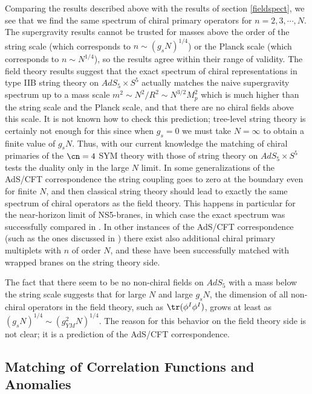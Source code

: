 Comparing the results described above with the results of section
\ref{fieldspect}, we see that we find the same spectrum of chiral
primary operators for $n=2,3,\cdots,N$. The supergravity results
cannot be trusted for masses above the order of the string scale
(which corresponds to $n\sim (g_s N)^{1/4}$) or the Planck scale
(which corresponds to $n\sim N^{1/4}$), so the results agree within
their range of validity. The field theory results suggest that the
exact spectrum of chiral representations in type IIB string theory on
$AdS_5\times S^5$ actually matches the naive supergravity spectrum up
to a mass scale $m^2 \sim N^2 / R^2 \sim N^{3/2} M_p^2$ which is much
higher than the string scale and the Planck scale, and that there are
no chiral fields above this scale. It is not known how to check this
prediction; tree-level string theory is certainly not enough for this
since when $g_s=0$ we must take $N=\infty$ to obtain a finite value of
$g_s N$. Thus, with our current knowledge the matching of chiral
primaries of the $\cn=4$ SYM theory with those of string theory on
$AdS_5\times S^5$ tests the duality only in the large $N$ limit. In
some generalizations of the AdS/CFT correspondence the string coupling
goes to zero at the boundary even for finite $N$, and then classical
string theory should lead to exactly the same spectrum of chiral
operators as the field theory. This happens in particular for 
the near-horizon limit of NS5-branes, 
in which case the exact spectrum was successfully compared in
\cite{Aharony:1998ub}. In other instances of the AdS/CFT
correspondence (such as the ones discussed in
\cite{Witten:1998xy,Klebanov:1998hh,Gubser:1998fp}) 
there exist also additional
chiral primary multiplets with $n$ of order $N$, and these have been
successfully matched with wrapped branes on the string theory side.

The fact that there seem to be no non-chiral fields on $AdS_5$ with a
mass below the string scale suggests that for large $N$ and large $g_s
N$, the dimension of all non-chiral operators in the field theory,
such as $\tr(\phi^I \phi^I)$, grows at least as $(g_s N)^{1/4} \sim
(g_{YM}^2 N)^{1/4}$. The reason for this behavior on the field theory
side is not clear; it is a prediction of the AdS/CFT correspondence.

\subsection{Matching of Correlation Functions and Anomalies}
\label{anomalies}

